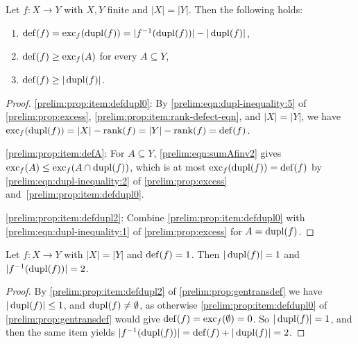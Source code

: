 \begin{proposition} \label{prelim:prop:gentransdef}
	Let $f \colon X \to Y$ with $X,Y$ finite and $|X| = |Y|$.
	Then the following holds:
	\begin{enumerate}
		\item \label{prelim:prop:item:defdupl0}
		$\operatorname{def}(f) = \operatorname{exc}_{f}(\operatorname{dupl}(f)) = |f^{-1}(\operatorname{dupl}(f))| - |\operatorname{dupl}(f)|$,
		
		\item \label{prelim:prop:item:defA} $\operatorname{def}(f) \ge \operatorname{exc}_{f}(A)$
		for every $A \subseteq Y$,
		
		\item \label{prelim:prop:item:defdupl2} $\operatorname{def}(f) \ge |\operatorname{dupl}(f)|$.
	\end{enumerate}
\end{proposition}
\begin{proof}
	\ref{prelim:prop:item:defdupl0}: By
	\cref{prelim:eqn:dupl-inequality:5} of \cref{prelim:prop:excess},
	\cref{prelim:prop:item:rank-defect-eqn}, and $|X| = |Y|$, we have
	$\operatorname{exc}_{f}(\operatorname{dupl}(f)) = |X| - \operatorname{rank}(f) = |Y| - \operatorname{rank}(f) = \operatorname{def}(f)$.
	
	\ref{prelim:prop:item:defA}: For $A \subseteq Y$,
	\cref{prelim:eqn:sumAfinv2} gives
	$\operatorname{exc}_{f}(A) \le \operatorname{exc}_{f}(A \cap \operatorname{dupl}(f))$, which is at most
	$\operatorname{exc}_{f}(\operatorname{dupl}(f)) = \operatorname{def}(f)$ by
	\cref{prelim:eqn:dupl-inequality:2} of \cref{prelim:prop:excess}
	and~\cref{prelim:prop:item:defdupl0}.
	
	\ref{prelim:prop:item:defdupl2}: Combine \cref{prelim:prop:item:defdupl0}
	with \cref{prelim:eqn:dupl-inequality:1} of \cref{prelim:prop:excess}
	for $A = \operatorname{dupl}(f)$.
\end{proof}

\begin{corollary} \label{prelim:cor:defect-one}
	Let $f \colon X \to Y$ with $|X| = |Y|$ and $\operatorname{def}(f) = 1$.
	Then $|\operatorname{dupl}(f)| = 1$ and $|f^{-1}(\operatorname{dupl}(f))| = 2$.
\end{corollary}
\begin{proof}
	By \cref{prelim:prop:item:defdupl2} of \cref{prelim:prop:gentransdef} we
	have $|\operatorname{dupl}(f)| \le 1$, and $\operatorname{dupl}(f) \ne \emptyset$, as otherwise
	\cref{prelim:prop:item:defdupl0} of \cref{prelim:prop:gentransdef} 
	would give $\operatorname{def}(f) = \operatorname{exc}_{f}(\emptyset) = 0$.
	So $|\operatorname{dupl}(f)| = 1$, and then the same item yields
	$|f^{-1}(\operatorname{dupl}(f))| = \operatorname{def}(f) + |\operatorname{dupl}(f)| = 2$.
\end{proof}
